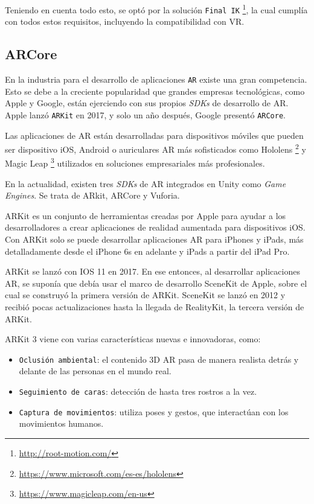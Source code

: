 Teniendo en cuenta todo esto, se optó por la solución \texttt{Final IK} \footnote{\url{http://root-motion.com/}}, la cual cumplía con todos estos requisitos, incluyendo la compatibilidad con VR. 

\subsection{ARCore}
\label{cap5:sec:ARCore}

En la industria para el desarrollo de aplicaciones \texttt{AR} existe una gran competencia. Esto se debe a la creciente popularidad que grandes empresas tecnológicas, como Apple y Google, están ejerciendo con sus propios \textit{SDKs} de desarrollo de AR. Apple lanzó \texttt{ARKit} en 2017, y solo un año después, Google presentó \texttt{ARCore}.

Las aplicaciones de AR están desarrolladas para dispositivos móviles que pueden ser dispositivo iOS, Android o auriculares AR más sofisticados como Hololens \footnote{\url{ https://www.microsoft.com/es-es/hololens}} y Magic Leap \footnote{\url{ https://www.magicleap.com/en-us}} utilizados en soluciones empresariales más profesionales.

En la actualidad, existen tres \textit{SDKs} de AR integrados en Unity como \textit{Game Engines}. Se trata de ARkit, ARCore y Vuforia. 

ARKit es un conjunto de herramientas creadas por Apple para ayudar a los desarrolladores a crear aplicaciones de realidad aumentada para dispositivos iOS. Con ARKit solo se puede desarrollar aplicaciones AR para iPhones y iPads, más detalladamente desde el iPhone 6s en adelante y iPads a partir del iPad Pro.

ARKit se lanzó con IOS 11 en 2017. En ese entonces, al desarrollar aplicaciones AR, se suponía que debía usar el marco de desarrollo SceneKit de Apple, sobre el cual se construyó la primera versión de ARKit. SceneKit se lanzó en 2012 y recibió pocas actualizaciones hasta la llegada de RealityKit, la tercera versión de ARKit.

ARKit 3 viene con varias características nuevas e innovadoras, como:

\begin{itemize}
    \item \texttt{Oclusión ambiental}: el contenido 3D AR pasa de manera realista detrás y delante de las personas en el mundo real.
    \item \texttt{Seguimiento de caras}: detección de hasta tres rostros a la vez.
    \item \texttt{Captura de movimientos}: utiliza poses y gestos, que interactúan con los movimientos humanos.
\end{itemize}

